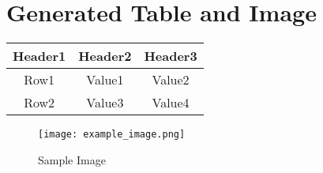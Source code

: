 \documentclass{article}
\begin{document}
    \section*{Generated Table and Image}
    \begin{tabular}{|c | c | c|}
\hline
Header1 & Header2 & Header3 \\
\hline
Row1 & Value1 & Value2 \\
\hline
Row2 & Value3 & Value4 \\
\hline
\end{tabular}
\begin{figure}[h!]
\centering
\texttt{[image: example\_image.png]}
\caption{Sample Image}
\label{fig:sample}
\end{figure}
    
\end{document}
